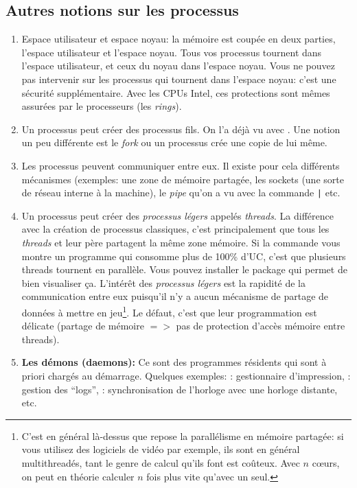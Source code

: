 \subsection{Autres  notions sur les processus}
\begin{enumerate}
\item Espace utilisateur et espace noyau: la mémoire est coupée en
  deux parties, l'espace utilisateur et l'espace noyau. Tous vos
  processus tournent dans l'espace utilisateur, et ceux du noyau dans
  l'espace noyau. Vous ne pouvez pas intervenir sur les processus qui
  tournent dans l'espace noyau: c'est une sécurité
  supplémentaire. Avec les CPUs Intel, ces protections sont mêmes
  assurées par le processeurs (les \emph{rings}).
\item Un processus peut créer des processus fils. On l'a déjà vu avec
  . Une notion un peu différente est le \emph{fork} ou un
  processus crée une copie de lui même.

\item Les processus peuvent communiquer entre eux. Il existe pour cela
  différents mécanismes (exemples: une zone de mémoire partagée, les
  sockets (une sorte de réseau interne à la machine), le \emph{pipe}
  qu'on a vu avec la commande \texttt{|} etc.
  
\item Un processus peut créer des \emph{processus légers} appelés
  \emph{threads}. La différence avec la création de processus classiques,
  c'est principalement que tous les \emph{threads} et leur père
  partagent la même zone mémoire. Si la commande  vous montre
  un programme qui consomme plus de 100\% d'UC, c'est que plusieurs
  threads tournent en parallèle. Vous pouvez installer le package
   qui permet de bien visualiser ça. L'intérêt des
  \emph{processus légers} est la rapidité de la communication entre
  eux puisqu'il n'y a aucun mécanisme de partage de données à mettre
  en jeu\footnote{C'est en général là-dessus que repose la parallélisme
    en mémoire partagée: si vous utilisez des logiciels de vidéo par
    exemple, ils 
    sont en général multithreadés, tant le genre de calcul qu'ils font
    est coûteux. Avec $n$ c{\oe}urs, on peut en théorie calculer $n$ fois
    plus vite qu'avec un seul.}. Le défaut, c'est que leur
  programmation est délicate (partage de mémoire $=>$ pas de
  protection d'accès mémoire entre threads).

\item \textbf{Les démons (daemons):}
 Ce   sont des programmes résidents qui sont à priori  chargés au
 démarrage.
 Quelques exemples: : gestionnaire d'impression,
 : gestion des ``logs'', : synchronisation de
 l'horloge avec une horloge distante, etc.
\end{enumerate}



